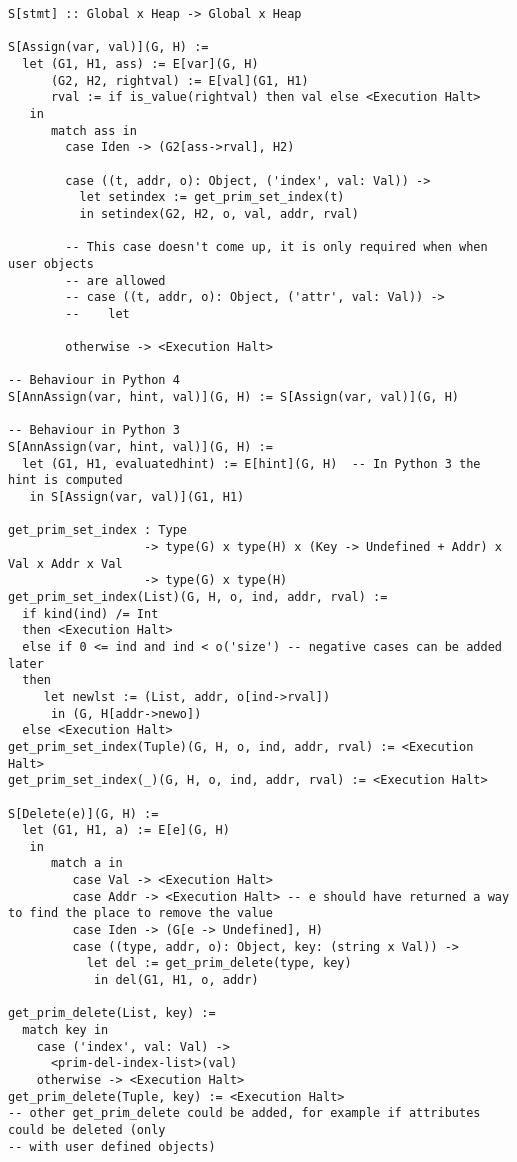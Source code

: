 \begin{verbatim}
S[stmt] :: Global x Heap -> Global x Heap

S[Assign(var, val)](G, H) :=
  let (G1, H1, ass) := E[var](G, H)
      (G2, H2, rightval) := E[val](G1, H1)
      rval := if is_value(rightval) then val else <Execution Halt>
   in
      match ass in
        case Iden -> (G2[ass->rval], H2)

        case ((t, addr, o): Object, ('index', val: Val)) ->
          let setindex := get_prim_set_index(t)
          in setindex(G2, H2, o, val, addr, rval)

        -- This case doesn't come up, it is only required when when user objects
        -- are allowed
        -- case ((t, addr, o): Object, ('attr', val: Val)) ->
        --    let

        otherwise -> <Execution Halt>

-- Behaviour in Python 4
S[AnnAssign(var, hint, val)](G, H) := S[Assign(var, val)](G, H)

-- Behaviour in Python 3
S[AnnAssign(var, hint, val)](G, H) :=
  let (G1, H1, evaluatedhint) := E[hint](G, H)  -- In Python 3 the hint is computed
   in S[Assign(var, val)](G1, H1)

get_prim_set_index : Type
                   -> type(G) x type(H) x (Key -> Undefined + Addr) x Val x Addr x Val
                   -> type(G) x type(H)
get_prim_set_index(List)(G, H, o, ind, addr, rval) :=
  if kind(ind) /= Int
  then <Execution Halt>
  else if 0 <= ind and ind < o('size') -- negative cases can be added later
  then
     let newlst := (List, addr, o[ind->rval])
      in (G, H[addr->newo])
  else <Execution Halt>
get_prim_set_index(Tuple)(G, H, o, ind, addr, rval) := <Execution Halt>
get_prim_set_index(_)(G, H, o, ind, addr, rval) := <Execution Halt>

S[Delete(e)](G, H) :=
  let (G1, H1, a) := E[e](G, H)
   in
      match a in
         case Val -> <Execution Halt>
         case Addr -> <Execution Halt> -- e should have returned a way to find the place to remove the value
         case Iden -> (G[e -> Undefined], H)
         case ((type, addr, o): Object, key: (string x Val)) ->
           let del := get_prim_delete(type, key)
            in del(G1, H1, o, addr)

get_prim_delete(List, key) :=
  match key in
    case ('index', val: Val) ->
      <prim-del-index-list>(val)
    otherwise -> <Execution Halt>
get_prim_delete(Tuple, key) := <Execution Halt>
-- other get_prim_delete could be added, for example if attributes could be deleted (only
-- with user defined objects)


\end{verbatim}
